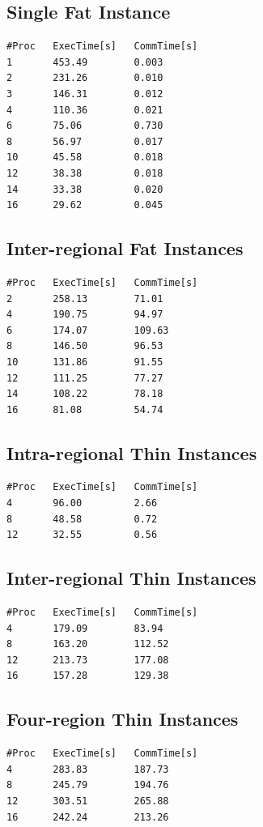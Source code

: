 \documentclass{article}
\begin{document}
\subsection{Single Fat Instance}
\begin{verbatim}
#Proc   ExecTime[s]   CommTime[s]
1       453.49        0.003
2       231.26        0.010
3       146.31        0.012
4       110.36        0.021
6       75.06         0.730
8       56.97         0.017
10      45.58         0.018
12      38.38         0.018
14      33.38         0.020
16      29.62         0.045
\end{verbatim}

\subsection{Inter-regional Fat Instances}
\begin{verbatim}
#Proc   ExecTime[s]   CommTime[s]
2       258.13        71.01
4       190.75        94.97
6       174.07        109.63
8       146.50        96.53
10      131.86        91.55
12      111.25        77.27
14      108.22        78.18
16      81.08         54.74
\end{verbatim}

\subsection{Intra-regional Thin Instances}
\begin{verbatim}
#Proc   ExecTime[s]   CommTime[s]
4       96.00         2.66
8       48.58         0.72
12      32.55         0.56
\end{verbatim}

\subsection{Inter-regional Thin Instances}
\begin{verbatim}
#Proc   ExecTime[s]   CommTime[s]
4       179.09        83.94
8       163.20        112.52
12      213.73        177.08
16      157.28        129.38
\end{verbatim}

\subsection{Four-region Thin Instances}
\begin{verbatim}
#Proc   ExecTime[s]   CommTime[s]
4       283.83        187.73
8       245.79        194.76
12      303.51        265.88
16      242.24        213.26
\end{verbatim}
\end{document}
